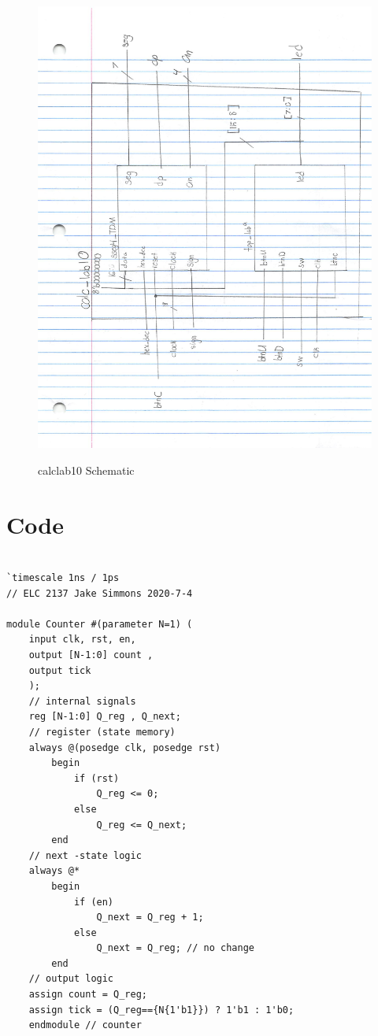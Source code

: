 \documentclass[11pt]{article}
\begin{document}
\begin{figure}[ht]\centering
	\caption{calclab10 Schematic}
	\includegraphics[width=1.15 \textwidth]{calc_lab10_Schematic.pdf}
	\label{fig:picture}
\end{figure}

\clearpage
\section*{Code}

\begin{lstlisting}[style=Verilog,
caption=Counter Module,
label=counter 
]

`timescale 1ns / 1ps
// ELC 2137 Jake Simmons 2020-7-4

module Counter #(parameter N=1) ( 
	input clk, rst, en, 
	output [N-1:0] count , 
	output tick 
	);
	// internal signals 
	reg [N-1:0] Q_reg , Q_next;
	// register (state memory) 
	always @(posedge clk, posedge rst) 
		begin 
			if (rst) 
				Q_reg <= 0; 
			else 
				Q_reg <= Q_next; 
		end
	// next -state logic 
	always @* 
		begin 
			if (en) 
				Q_next = Q_reg + 1; 
			else 
				Q_next = Q_reg; // no change 
		end
	// output logic 
	assign count = Q_reg; 
	assign tick = (Q_reg=={N{1'b1}}) ? 1'b1 : 1'b0;
	endmodule // counter
\end{lstlisting}
\end{document}
